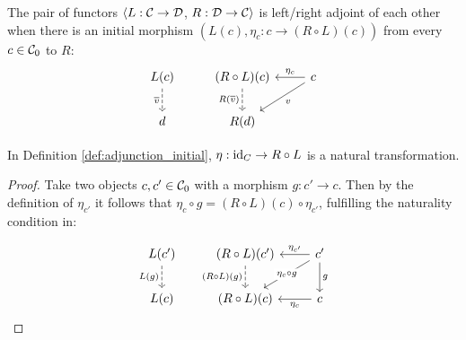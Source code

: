 \begin{definition}
  The pair of functors $\langle L: \mathcal{C}\to \mathcal{D}$, $R: \mathcal{D}\to \mathcal{C}\rangle$ is left/right adjoint of
  each other when there is an initial morphism $(L(c), \eta_c:c\to (R\circ
  L)(c))$ from every $c\in \mathcal{C}_0$ to $R$:
  \parencite{awodey:category_theory}
  \[\begin{tikzcd}[ampersand replacement=\&]
    {L(c)} \& {(R\circ L)(c)} \& c \\
    d \& {R(d)}
    \arrow["{\overline{v}}"', dashed, from=1-1, to=2-1]
    \arrow["{R(\overline{v})}"', dashed, from=1-2, to=2-2]
    \arrow["v", from=1-3, to=2-2]
    \arrow["{\eta_c}"', from=1-3, to=1-2]
  \end{tikzcd}\]
\end{definition}

\begin{theorem}
  In Definition \ref{def:adjunction_initial}, $\eta:\mathrm{id}_C \to R\circ L$ is a
  natural transformation.

  \begin{proof}
    Take two objects $c,c'\in \mathcal{C}_0$ with a morphism $g:c'\to c$. Then by the
    definition of $\eta_{c'}$ it follows that $\eta_c\circ g = (R\circ
    L)(c)\circ \eta_{c'}$, fulfilling the naturality condition in:

    \[\begin{tikzcd}[ampersand replacement=\&]
      {L(c')} \& {(R\circ L)(c')} \& {c'} \\
      {L(c)} \& {(R\circ L)(c)} \& c
      \arrow["{\eta_c}", from=2-3, to=2-2]
      \arrow["{\eta_{c'}}"', from=1-3, to=1-2]
      \arrow["g", from=1-3, to=2-3]
      \arrow["{(R\circ L)(g)}"', dashed, from=1-2, to=2-2]
      \arrow["{L(g)}"', dashed, from=1-1, to=2-1]
      \arrow["{\eta_c\circ g}"{description}, from=1-3, to=2-2]
    \end{tikzcd}\]
  \end{proof}
\end{theorem}


